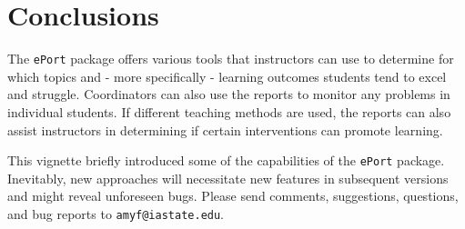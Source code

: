 \documentclass{article}\usepackage[]{graphicx}\usepackage[]{color}
\numberwithin{equation}{section} %
\newcommand{\pkg}[1]{{\texttt{#1}}}
\begin{document}
\section{Conclusions}

The \pkg{ePort} package offers various tools that instructors can use to determine for which topics and - more specifically - learning outcomes students tend to excel and struggle. Coordinators can also use the reports to monitor any problems in individual students. If different teaching methods are used, the reports can also assist instructors in determining if certain interventions can promote learning.

This vignette briefly introduced some of the capabilities of the \pkg{ePort} package. Inevitably, new approaches will necessitate new features in subsequent versions and might reveal unforeseen bugs. Please send comments, suggestions, questions, and bug reports to \texttt{amyf@iastate.edu}.
\end{document}
